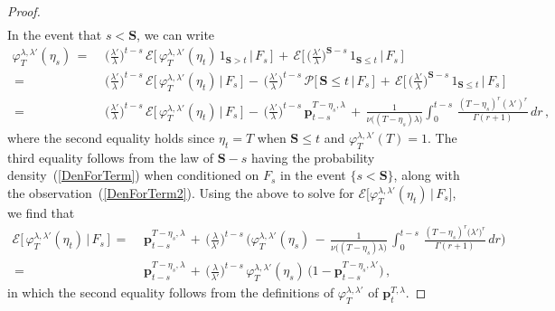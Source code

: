 \documentclass[10pt]{article}
\numberwithin{equation}{section}
\theoremstyle{definition}
\begin{document}
\begin{proof}
\begin{align*}
\end{align*}
In the event that $s<\mathbf{S}$,  we can write
\begin{align*}
\varphi_T^{\lambda,\lambda'}(\eta_s)   \,=\,&\, \Big(\frac{\lambda'}{\lambda}\Big)^{t-s}\,\mathcal{E}\Big[\, \varphi_T^{\lambda,\lambda'}(\eta_t)  \,
 1_{\mathbf{S} > t }\,\Big|\,F_s \,\Big] \,+\, \mathcal{E}\bigg[\, \Big(\frac{\lambda'}{\lambda}\Big)^{\mathbf{S}-s}\, 1_{\mathbf{S}\leq t  } \,\bigg|\,F_s \,\bigg] \nonumber\\ \,=\,&\, \Big(\frac{\lambda'}{\lambda}\Big)^{t-s}\,\mathcal{E}\Big[\, \varphi_T^{\lambda,\lambda'}(\eta_t)  
 \,\Big|\,F_s \,\Big] \,-\,\Big(\frac{\lambda'}{\lambda}\Big)^{t-s}\,\mathcal{P}\big[\, 
 \mathbf{S}\leq t\,\big|\,F_s \,\big]\,+\, \mathcal{E}\bigg[\, \Big(\frac{\lambda'}{\lambda}\Big)^{\mathbf{S}-s}\, 1_{\mathbf{S}\leq t  } \,\bigg|\,F_s \,\bigg]\nonumber
 \\ \,=\,&\, \Big(\frac{\lambda'}{\lambda}\Big)^{t-s}\,\mathcal{E}\Big[\, \varphi_T^{\lambda,\lambda'}(\eta_t)\,\Big|\,F_s \,\Big]\,-\,  \Big(\frac{\lambda'}{\lambda}\Big)^{t-s} \,\mathbf{p}_{t-s}^{T-\eta_s,\lambda  } \,+\, \frac{ 1 }{  \nu\big((T-\eta_s)\lambda \big)    }\int_0^{t-s}\, \frac{ (T-\eta_s)^r (\lambda')^r }{ \Gamma(r+1)  }\, dr \,,
\end{align*}
where  the second equality holds since $\eta_t=T$ when $\mathbf{S}\leq t$ and $\varphi_T^{\lambda,\lambda'}(T)=1 $.  The third equality follows from the  law of $\mathbf{S}-s$ having the probability density~(\ref{DenForTerm})  when conditioned on $F_s$ in the event $\{s<\mathbf{S}\}$, along with the observation~(\ref{DenForTerm2}). Using the above to solve for $\mathcal{E}\big[ \varphi_T^{\lambda,\lambda'}(\eta_t)\,\big|\,F_s \big] $, we find that 
\begin{align*}
\mathcal{E}\Big[\, \varphi_T^{\lambda,\lambda'}(\eta_t)\,\Big|\,F_s \,\Big] \,=\,&\,\mathbf{p}_{t-s}^{T-\eta_s,\lambda  }\,+\,\Big(\frac{\lambda}{\lambda'}\Big)^{t-s} \,\Bigg(\varphi_T^{\lambda,\lambda'}(\eta_s)  \,-\, \frac{ 1  }{  \nu\big((T-\eta_s)\lambda \big)    }\,\int_0^{t-s}\, \frac{  (T-\eta_s)^r \big(\lambda'\big)^r }{ \Gamma(r+1)  } \,dr\Bigg)  \nonumber \\
\,=\,&\,   \mathbf{p}_{t-s}^{T-\eta_s,\lambda  }\,+\,\Big(\frac{\lambda}{\lambda'}\Big)^{t-s} \, \varphi_T^{\lambda,\lambda'}(\eta_s)\,\Big(1-\mathbf{p}_{t-s}^{T-\eta_s,\lambda'  }  \Big) \,, \nonumber 
\end{align*}
in which the second equality follows from the definitions of  $   \varphi_T^{\lambda,\lambda'}$ of $\mathbf{p}_{t}^{T,\lambda  } $.

\end{proof}
\end{document}
